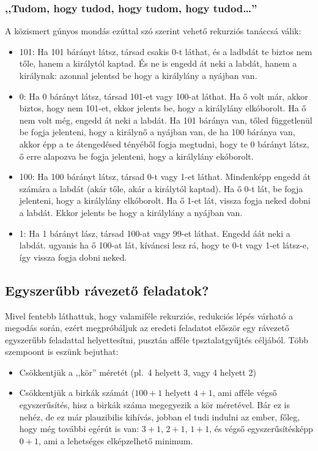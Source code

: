 \documentclass{article}
\begin{document}
	\subsubsection{,,Tudom, hogy tudod, hogy tudom, hogy tudod\dots''}

	A közismert gúnyos mondás ezúttal szó szerint vehető rekurziós tanáccsá válik:

	\begin{itemize}
		\item 101: Ha 101 bárányt látsz, társad csakis 0-t láthat, és a ladbdát te biztos nem tőle, hanem a királytól kaptad. És ne is engedd át neki a labdát, hanem a királynak: azonnal jelentsd be hogy a királylány a nyájban van.
		\item 0: Ha   0 bárányt látsz, társad 101-et vagy 100-at láthat. Ha ő volt már, akkor biztos, hogy nem 101-et, ekkor jelents be, hogy a királylány elkóborolt. Ha ő nem volt még, engedd át neki a labdát. Ha 101 báránya van, tőled függetlenül be fogja jelenteni, hogy a királynő a nyájban van, de ha 100 báránya van, akkor  épp a te átengedésed tényéből fogja megtudni, hogy te 0 bárányt látsz, ő erre alapozva be fogja jelenteni, hogy a királylány ekóborolt.
		\item 100: Ha 100 bárányt látsz, társad 0-t vagy 1-et láthat. Mindenképp engedd át számára a labdát (akár tőle, akár a királytól kaptad). Ha ő 0-t lát, be fogja jelenteni, hogy a királylány elkóborolt. Ha ő 1-et lát, vissza fogja neked dobni a labdát. Ekkor jelents be hogy a királylány a nyájban van.
		\item 1: Ha 1 bárányt lász, társad 100-at vagy 99-et láthat. Engedd áát neki a labdát. ugyanis ha ő 100-at lát, kíváncsi lesz rá, hogy te 0-t vagy 1-et látsz-e, így vissza fogja dobni neked.
	\end{itemize}

	\subsection{Egyszerűbb rávezető feladatok?}

	Mivel fentebb láthattuk, hogy valamiféle rekurziós, redukciós lépés várható a megodás során, ezért megpróbáljuk az eredeti feladatot először egy rávezető egyszerűbb feladattal helyettesítni, pusztán afféle tpsztalatgyűjtés céljából. Több szempoont is eszünk bejuthat: 

	\begin{itemize}
		\item Csökkentjük a ,,kör'' méretét (pl.~4 helyett 3, vagy 4 helyett 2)
		\item Csökkentjük a birkák számát ($100 + 1$ helyett $4 +1$, ami afféle végső egyszerűsítés, hisz a birkák száma megegyezik a kör méretével. Bár ez is nehéz, de ez már plauzibilis kihívás, jobban el tudi indulni az ember, főleg, hogy még további egérút is van: $3 +1$, $2 + 1$, $1 + 1$, és végső egyszerűsítésképp $0 + 1$, ami a lehetséges elképzelhető minimum.
	\end{itemize}
\end{document}
